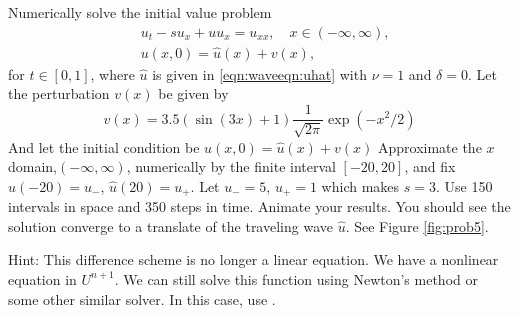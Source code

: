 \begin{problem}
\label{prob:prob5}
Numerically solve the initial value problem
\begin{align*}
	&{ } u_t -su_x + uu_x = u_{xx}, \quad x \in (-\infty,\infty),\\
	&{ } u(x,0) = \hat{u}(x)+v(x),
\end{align*}
for $t \in [0,1]$, where $\hat{u}$ is given in \eqref{eqn:waveeqn:uhat} with $\nu=1$ and $\delta=0$.
Let the perturbation $v(x)$ be given by
\[v(x) = 3.5(\sin{(3x)} + 1)\frac{1}{\sqrt{2\pi}} \exp{(-x^2/2)}\]
And let the initial condition be $u(x, 0) = \hat{u}(x) + v(x)$
Approximate the $x$ domain,$(-\infty, \infty)$, numerically by the finite interval $[-20,20]$, and fix $\hat{u}(-20) = u_-$, $\hat{u}(20) = u_+$. Let $u_- = 5$, $u_+ = 1$ which makes $s = 3$.
Use 150 intervals in space and 350 steps in time.
Animate your results.
You should see the solution converge to a translate of the traveling wave $\hat{u}$.
See Figure \ref{fig:prob5}.

Hint: This difference scheme is no longer a linear equation.
We have a nonlinear equation in $U^{n+1}$.
We can still solve this function using Newton's method or some other similar solver.
In this case, use .


\end{problem}
